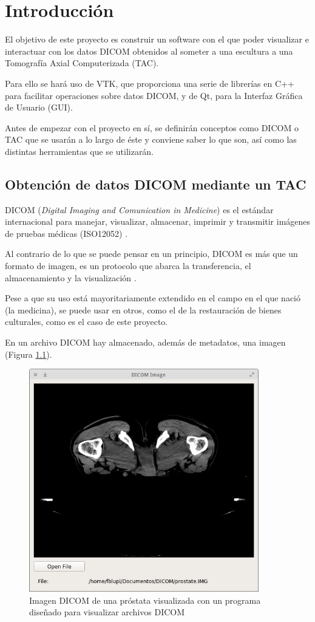\chapter{Introducción}

El objetivo de este proyecto es construir un software con el que poder visualizar e interactuar con los datos DICOM obtenidos al someter a una escultura a una Tomografía Axial Computerizada (TAC). 

Para ello se hará uso de VTK, que proporciona una serie de librerías en C++ para facilitar operaciones sobre datos DICOM, y de Qt, para la Interfaz Gráfica de Usuario (GUI).

Antes de empezar con el proyecto en sí, se definirán conceptos como DICOM o TAC que se usarán a lo largo de éste y conviene saber lo que son, así como las distintas herramientas que se utilizarán.

\section{Obtención de datos DICOM mediante un TAC}

DICOM (\textit{Digital Imaging and Comunication in Medicine}) es el estándar internacional para manejar, visualizar, almacenar, imprimir y transmitir imágenes de pruebas médicas (ISO12052) \cite{about_dicom}. 

Al contrario de lo que se puede pensar en un principio, DICOM es más que un formato de imagen, es un protocolo que abarca la transferencia, el almacenamiento y la visualización \cite{dicom_intro_and_guide}.

Pese a que su uso está mayoritariamente extendido en el campo en el que nació (la medicina), se puede usar en otros, como el de la restauración de bienes culturales, como es el caso de este proyecto.

En un archivo DICOM hay almacenado, además de metadatos, una imagen \cite{dicom_classes_vtk} (Figura \ref{fig:prostate_dicom}).

\begin{figure}[H]
	\centering
	\includegraphics[width=10cm]{imagenes/prostate_dicom}
	\caption{Imagen DICOM de una próstata visualizada con un programa diseñado para visualizar archivos DICOM}
	\label{fig:prostate_dicom}
\end{figure}

